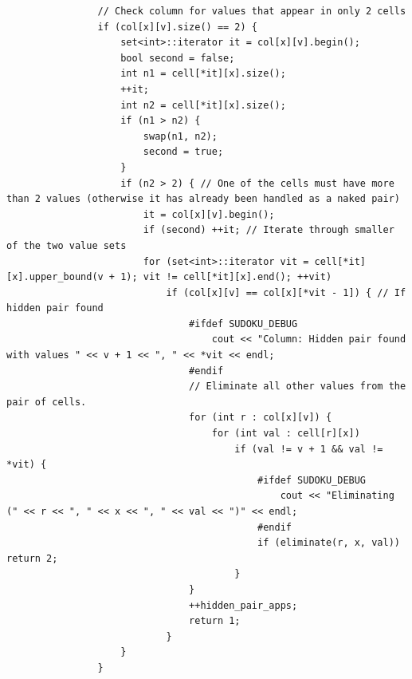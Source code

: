 \documentclass{article}
\begin{document}
\begin{lstlisting}
                // Check column for values that appear in only 2 cells
                if (col[x][v].size() == 2) {
                    set<int>::iterator it = col[x][v].begin();
                    bool second = false;
                    int n1 = cell[*it][x].size();
                    ++it;
                    int n2 = cell[*it][x].size();
                    if (n1 > n2) {
                        swap(n1, n2);
                        second = true;
                    }
                    if (n2 > 2) { // One of the cells must have more than 2 values (otherwise it has already been handled as a naked pair)
                        it = col[x][v].begin();
                        if (second) ++it; // Iterate through smaller of the two value sets
                        for (set<int>::iterator vit = cell[*it][x].upper_bound(v + 1); vit != cell[*it][x].end(); ++vit)
                            if (col[x][v] == col[x][*vit - 1]) { // If hidden pair found
                                #ifdef SUDOKU_DEBUG
                                    cout << "Column: Hidden pair found with values " << v + 1 << ", " << *vit << endl;
                                #endif
                                // Eliminate all other values from the pair of cells.
                                for (int r : col[x][v]) {
                                    for (int val : cell[r][x])
                                        if (val != v + 1 && val != *vit) {
                                            #ifdef SUDOKU_DEBUG
                                                cout << "Eliminating (" << r << ", " << x << ", " << val << ")" << endl;
                                            #endif
                                            if (eliminate(r, x, val)) return 2;
                                        }
                                }
                                ++hidden_pair_apps;
                                return 1;
                            }
                    }
                }


\end{lstlisting}
\end{document}
